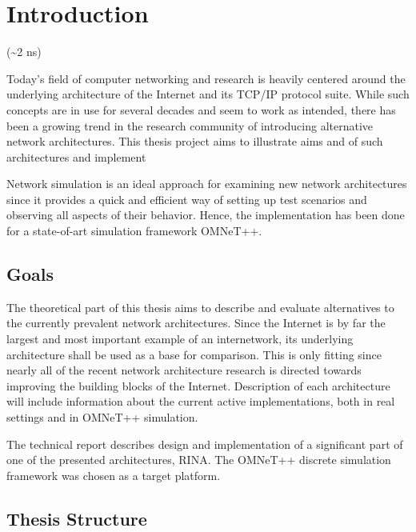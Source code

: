 

\chapter{Introduction}
    (\textasciitilde2 ns)

        Today's field of computer networking and research is heavily centered around the underlying architecture of the Internet and its TCP/IP protocol suite. While such concepts are in use for several decades and seem to work as intended, there has been a growing trend in the research community of introducing alternative network architectures. This thesis project aims to illustrate aims and of such architectures and implement

        Network simulation is an ideal approach for examining new network architectures since it provides a quick and efficient way of setting up test scenarios and observing all aspects of their behavior. Hence, the implementation has been done for a state-of-art simulation framework OMNeT++.


    \section{Goals}
        The theoretical part of this thesis aims to describe and evaluate alternatives to the currently prevalent network architectures. Since the Internet is by far the largest and most important example of an internetwork, its underlying architecture shall be used as a base for comparison. This is only fitting since nearly all of the recent network architecture research is directed towards improving the building blocks of the Internet. Description of each architecture will include information about the current active implementations, both in real settings and in OMNeT++ simulation.

        The technical report describes design and implementation of a significant part of one of the presented architectures, RINA. The OMNeT++ discrete simulation framework was chosen as a target platform.

    \section{Thesis Structure}

